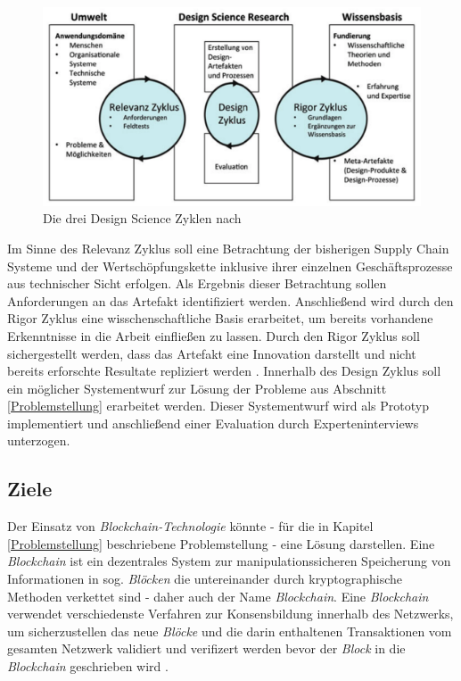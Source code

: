 \begin{figure}[h!]
	\centering
	\includegraphics[width=1.0\linewidth]{pictures/three-cycles-design-science}
	\caption[Die drei Design Science Zyklen nach Hevner]{Die drei Design Science Zyklen nach \citet{Hevner2010} \citep{Trepper2015}}
	\label{fig:three-cycles-design-science}
\end{figure}

Im Sinne des Relevanz Zyklus \citep[siehe auch][]{Simon1996} soll eine Betrachtung der bisherigen Supply Chain Systeme und der Wertschöpfungskette inklusive ihrer einzelnen Geschäftsprozesse aus technischer Sicht erfolgen. Als Ergebnis dieser Betrachtung sollen Anforderungen an das Artefakt identifiziert werden. Anschließend wird durch den Rigor Zyklus eine wisschenschaftliche Basis erarbeitet, um bereits vorhandene Erkenntnisse in die Arbeit einfließen zu lassen. Durch den Rigor Zyklus soll sichergestellt werden, dass das Artefakt eine Innovation darstellt und nicht bereits erforschte Resultate repliziert werden \citep{Hevner2010}. Innerhalb des Design Zyklus soll ein möglicher Systementwurf zur Lösung der Probleme aus Abschnitt \ref{Problemstellung} erarbeitet werden. Dieser Systementwurf wird als Prototyp implementiert und anschließend einer Evaluation durch Experteninterviews \citep[siehe auch][]{Wilde2007} unterzogen.

\subsection{Ziele}

Der Einsatz von \textit{Blockchain-Technologie} könnte - für die in Kapitel \ref{Problemstellung} beschriebene Problemstellung - eine Lösung darstellen. Eine \textit{Blockchain} ist ein dezentrales System zur manipulationssicheren Speicherung von Informationen in sog. \textit{Blöcken} die untereinander durch kryptographische Methoden verkettet sind - daher auch der Name \textit{Blockchain}. Eine \textit{Blockchain} verwendet verschiedenste Verfahren zur Konsensbildung innerhalb des Netzwerks, um sicherzustellen das neue \textit{Blöcke} und die darin enthaltenen Transaktionen vom gesamten Netzwerk validiert und verifizert werden bevor der \textit{Block} in die \textit{Blockchain} geschrieben wird \citep[siehe auch][]{Nakamoto2009, Buterin2014, Cardano2017, carVertical}.

